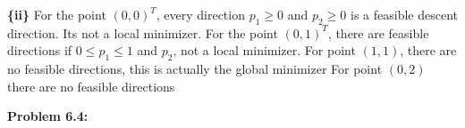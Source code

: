 \documentclass{article}
\begin{document}
\indent \textbf{\{ii\}} \newline For the point $(0,0)^T$, every direction $p_1 \geq 0$ and $p_2 \geq 0$ is a feasible descent direction. Its not a local minimizer. \newline
For the point $(0,1)^T$, there are feasible directions if $0 \leq p_1 \leq 1$ and $p_2 $, not a local minimizer. \newline
For point $(1,1)$, there are no feasible directions, this is actually the global minimizer \newline
For point $(0,2)$ there are no feasible directions

\textbf{Problem 6.4:}
\end{document}
